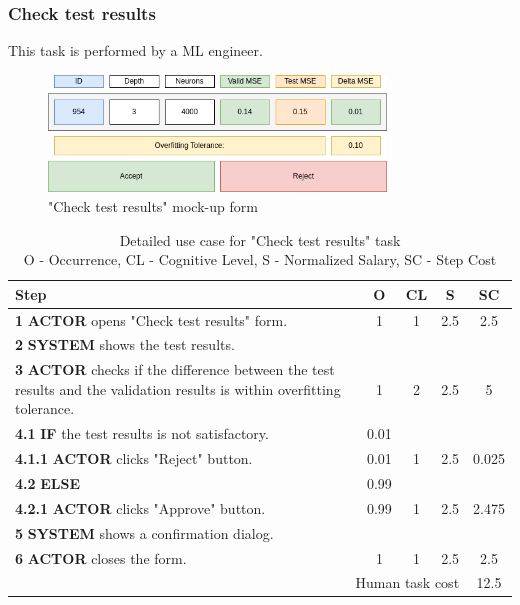 \subsubsection{Check test results}

This task is performed by a ML engineer.

\begin{figure}[H]
\centering
\includegraphics[width=0.8\textwidth]{figures/check_test_results.png}
\caption{"Check test results" mock-up form}
\end{figure}

\begin{table}[H]
\centering
\begin{tabularx}{\textwidth}{|X|c|c|c|c|}
\hline
\textbf{Step} & \textbf{O} & \textbf{CL} & \textbf{S} & \textbf{SC} \\
\hline
\textbf{1} \textbf{ACTOR} opens "Check test results" form. & 1 & 1 & 2.5 & 2.5 \\
\hline
\textbf{2} \textbf{SYSTEM} shows the test results. & & & & \\
\hline
\textbf{3} \textbf{ACTOR} checks if the difference between the test results and the validation results is within overfitting tolerance. & 1 & 2 & 2.5 & 5 \\
\hline
\textbf{4.1} \textbf{IF} the test results is not satisfactory. & 0.01 & & & \\
\hline
\textbf{4.1.1} \textbf{ACTOR} clicks "Reject" button. & 0.01 & 1 & 2.5 & 0.025 \\
\hline
\textbf{4.2} \textbf{ELSE} & 0.99 & & & \\
\hline
\textbf{4.2.1} \textbf{ACTOR} clicks "Approve" button. & 0.99 & 1 & 2.5 & 2.475 \\
\hline
\textbf{5} \textbf{SYSTEM} shows a confirmation dialog. & & & & \\
\hline
\textbf{6} \textbf{ACTOR} closes the form. & 1 & 1 & 2.5 & 2.5 \\
\hline
\multicolumn{4}{|r|}{Human task cost} & 12.5 \\
\hline
\end{tabularx}
\caption{Detailed use case for "Check test results" task\\ 
O - Occurrence, CL - Cognitive Level, S - Normalized Salary, SC - Step Cost}
\label{table:check_test_results}
\end{table}


